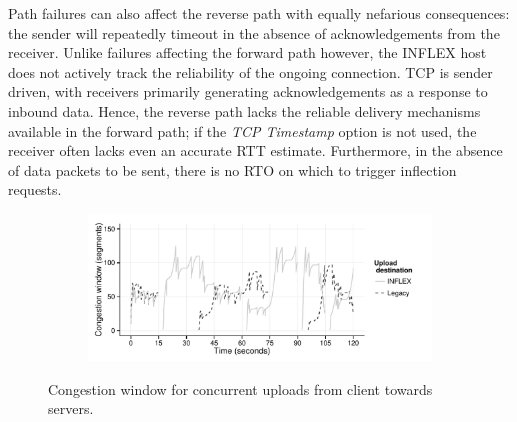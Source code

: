 Path failures can also affect the reverse path with equally nefarious consequences: the sender will repeatedly timeout in the absence of acknowledgements from the receiver.
Unlike failures affecting the forward path however, the INFLEX host does not actively track the reliability of the ongoing connection.
\ac{TCP} is sender driven, with receivers primarily generating acknowledgements as a response to inbound data. 
Hence, the reverse path lacks the reliable delivery mechanisms available in the forward path; if the \emph{\ac{TCP} Timestamp} option is not used, the receiver often lacks even an accurate RTT estimate.
Furthermore, in the absence of data packets to be sent, there is no \ac{RTO} on which to trigger inflection requests.

\begin{figure}
    \begin{subfigure}[b]{1.0\linewidth}
        \centering
        \includegraphics[width=4.5in]{figures/inflex/recv-cwnd.pdf}
    \end{subfigure}
    \caption[Congestion window for concurrent uploads from client.]{Congestion window for concurrent uploads from client towards servers.\label{fig:receiver}}
\end{figure}

